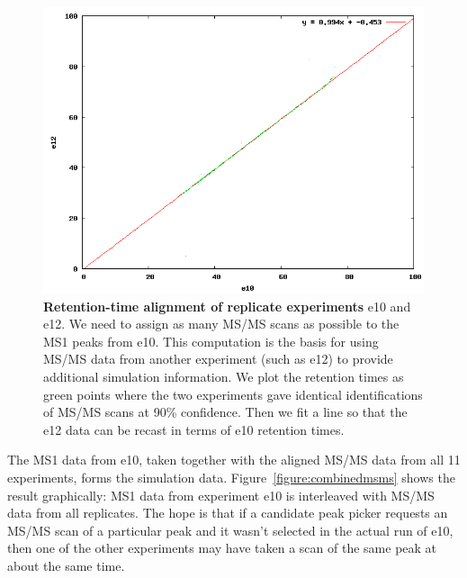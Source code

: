 \documentclass[12pt,twoside,openright]{report}
\begin{document}
\begin{figure}
\centering
\includegraphics[width=6.0in]{e10-vs-e12.png}
\caption[Retention-time alignment of replicate experiments]{{\bf Retention-time
    alignment of replicate experiments} e10 and e12. We need to assign as many
  MS/MS scans as possible to the MS1 peaks from e10. This computation is the
  basis for using MS/MS data from another experiment (such as e12) to provide
  additional simulation information. We plot the retention times as green points
  where the two experiments gave identical identifications of MS/MS scans at
  90\% confidence. Then we fit a line so that the e12 data can be recast in
  terms of e10 retention times.
  \label{figure:alignment}}
\end{figure}

The MS1 data from e10, taken together with the aligned MS/MS data from all 11
experiments, forms the simulation data. Figure~\ref{figure:combinedmsms} shows
the result graphically: MS1 data from experiment e10 is interleaved with MS/MS
data from all replicates. The hope is that if a candidate peak picker requests
an MS/MS scan of a particular peak and it wasn't selected in the actual run of
e10, then one of the other experiments may have taken a scan of the same peak at
about the same time.
\end{document}
